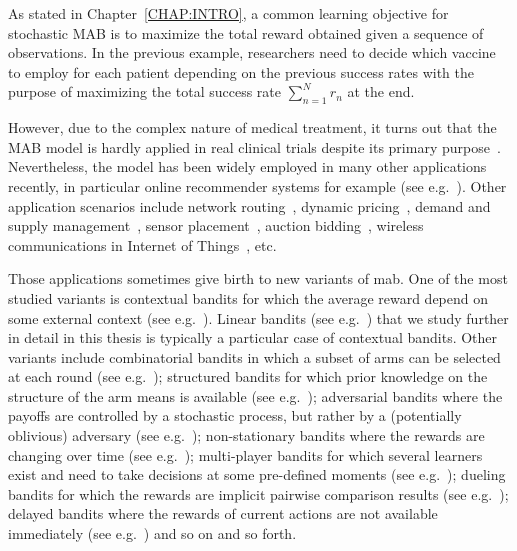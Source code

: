 As stated in Chapter~\ref{CHAP:INTRO}, a common learning objective for stochastic MAB is to maximize the total reward obtained given a sequence of observations. In the previous example, researchers need to decide which vaccine to employ for each patient depending on the previous success rates with the purpose of maximizing the total success rate $\sum_{n=1}^N r_n$ at the end.

However, due to the complex nature of medical treatment, it turns out that the MAB model is hardly applied in real clinical trials despite its primary purpose~\citep{reda2020drug}. Nevertheless, the model has been widely employed in many other applications recently, in particular online recommender systems for example (see e.g.~\citealt{li2010contextual,zeng2016online}). Other application scenarios include network routing~\citep{talebi2018osp}, dynamic pricing~\citep{zhai2011pricing}, demand and supply management~\citep{bregere2019contextual}, sensor placement~\citep{grant2019sensors}, auction bidding~\citep{cesa-bianchi2015auction}, wireless communications in Internet of Things~\citep{besson2019thesis}, etc. 

Those applications sometimes give birth to new variants of \gls{mab}. One of the most studied variants is contextual bandits for which the average reward depend on some external context (see e.g.~\citealt{li2010contextual,krause11contextual}). Linear bandits (see e.g.~\citealt{abbasi-yadkori2011linear}) that we study further in detail in this thesis is typically a particular case of contextual bandits. Other variants include combinatorial bandits in which a subset of arms can be selected at each round (see e.g.~\citealt{cesa-bianchi2012combinatorial,perrault2020semi,chen2014combinatorial}); structured bandits for which prior knowledge on the structure of the arm means is available (see e.g.~\citealt{karnin2016structure,degenne2020structure}); adversarial bandits where the payoffs are controlled by a stochastic process, but rather by a (potentially oblivious) adversary (see e.g.~\citealt{auer2002exp3}); non-stationary bandits where the rewards are changing over time (see e.g.~\citealt{mellor2013nonstationary,allesiardo2017nonstationary}); multi-player bandits for which several learners exist and need to take decisions at some pre-defined moments (see e.g.~\citealt{besson2018multiplayer}); dueling bandits for which the rewards are implicit pairwise comparison results (see e.g.~\citealt{komiyama2015}); delayed bandits where the rewards of current actions are not available immediately (see e.g.~\citealt{vernade2017stochastic}) and so on and so forth.

